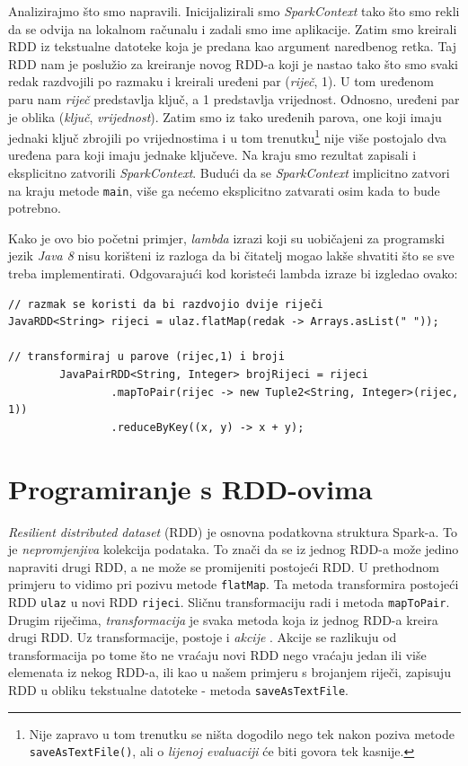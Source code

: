 \documentclass[times, utf8, zavrsni]{fer}
\begin{document}
\vspace{5mm}

Analizirajmo što smo napravili. Inicijalizirali smo \emph{SparkContext} tako što smo rekli da se odvija na lokalnom računalu i zadali smo ime aplikacije. Zatim smo kreirali RDD iz tekstualne datoteke koja je predana kao argument naredbenog retka. Taj RDD nam je poslužio za kreiranje novog RDD-a koji je nastao tako što smo svaki redak razdvojili po razmaku i kreirali uređeni par (\emph{riječ}, 1). U tom uređenom paru nam \emph{riječ} predstavlja ključ, a 1 predstavlja vrijednost. Odnosno, uređeni par je oblika (\emph{ključ}, \emph{vrijednost}). Zatim smo iz tako uređenih parova, one koji imaju jednaki ključ zbrojili po vrijednostima i u tom trenutku\footnote{Nije zapravo u tom trenutku se ništa dogodilo nego tek nakon poziva metode \texttt{saveAsTextFile()}, ali o \emph{lijenoj evaluaciji}  će biti govora tek kasnije.} nije više postojalo dva uređena para koji imaju jednake ključeve. Na kraju smo rezultat zapisali i eksplicitno zatvorili \emph{SparkContext}. Budući da se \emph{SparkContext} implicitno zatvori na kraju metode \texttt{main}, više ga nećemo eksplicitno zatvarati osim kada to bude potrebno.

Kako je ovo bio početni primjer, \emph{lambda} izrazi koji su uobičajeni za programski jezik \emph{Java 8} nisu korišteni iz razloga da bi čitatelj mogao lakše shvatiti što se sve treba implementirati. Odgovarajući kod koristeći lambda izraze bi izgledao ovako:
\vspace{5mm}
\begin{lstlisting}
// razmak se koristi da bi razdvojio dvije riječi
JavaRDD<String> rijeci = ulaz.flatMap(redak -> Arrays.asList(" "));

// transformiraj u parove (rijec,1) i broji
		JavaPairRDD<String, Integer> brojRijeci = rijeci
				.mapToPair(rijec -> new Tuple2<String, Integer>(rijec, 1))
				.reduceByKey((x, y) -> x + y);
\end{lstlisting}
\vspace{5mm}

\section{Programiranje s RDD-ovima}
\emph{Resilient distributed dataset} (RDD) je osnovna podatkovna struktura Spark-a. To je \emph{nepromjenjiva}  kolekcija podataka. To znači da se iz jednog RDD-a može jedino napraviti drugi RDD, a ne može se promijeniti postojeći RDD. U prethodnom primjeru to vidimo pri pozivu metode \texttt{flatMap}. Ta metoda transformira postojeći RDD \texttt{ulaz} u novi RDD \texttt{rijeci}. Sličnu transformaciju radi i metoda \texttt{mapToPair}. Drugim riječima, \emph{transformacija}  je svaka metoda koja iz jednog RDD-a kreira drugi RDD. Uz transformacije, postoje i \emph{akcije} . Akcije se razlikuju od transformacija po tome što ne vraćaju novi RDD nego vraćaju jedan ili više elemenata iz nekog RDD-a, ili kao u našem primjeru s brojanjem riječi, zapisuju RDD u obliku tekstualne datoteke - metoda \texttt{saveAsTextFile}.
\end{document}
